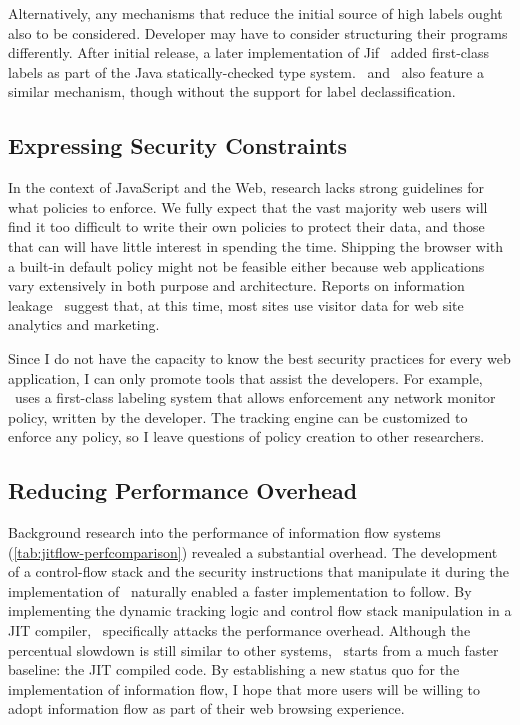 Alternatively, any mechanisms that reduce the initial source of high labels ought also to be considered.
Developer may have to consider structuring their programs differently.
After initial release, a later implementation of Jif~\cite{jif} added first-class labels as part of the Java statically-checked type system.
\FlowCore\ and \JitFlow\ also feature a similar mechanism, though without the support for label declassification.

\subsection{Expressing Security Constraints}

In the context of JavaScript and the Web, research lacks strong guidelines for what policies to enforce.
We fully expect that the vast majority web users will find it too difficult to write their own policies to protect their data, and those that can will have little interest in spending the time.
Shipping the browser with a built-in default policy might not be feasible either because web applications vary extensively in both purpose and architecture.
Reports on information leakage~\cite{jang.etal+10,nikiforakis.etal+12,kerschbaumer.etal+13} suggest that, at this time, most sites use visitor data for web site analytics and marketing.

Since I do not have the capacity to know the best security practices for every web application, I can only promote tools that assist the developers.
For example, \JitFlow\ uses a first-class labeling system that allows enforcement any network monitor policy, written by the developer.
The tracking engine can be customized to enforce any policy, so I leave questions of policy creation to other researchers.

\subsection{Reducing Performance Overhead}

Background research into the performance of information flow systems (\autoref{tab:jitflow-perfcomparison}) revealed a substantial overhead.
The development of a control-flow stack and the security instructions that manipulate it during the implementation of \FlowCore\ naturally enabled a faster implementation to follow.
By implementing the dynamic tracking logic and control flow stack manipulation in a JIT compiler, \JitFlow\ specifically attacks the performance overhead.
Although the percentual slowdown is still similar to other systems, \JitFlow\ starts from a much faster baseline: the JIT compiled code.
By establishing a new status quo for the implementation of information flow, I hope that more users will be willing to adopt information flow as part of their web browsing experience.

